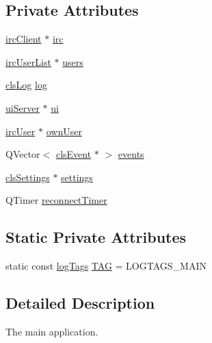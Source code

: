 \subsection*{Private Attributes}
\begin{DoxyCompactItemize}
\item 
\hyperlink{classserver_1_1irc_client}{irc\-Client} $\ast$ \hyperlink{classserver_1_1main_app_aba3a1f9b10639ec4ffc21dfbe70e0d35}{irc}
\item 
\hyperlink{classserver_1_1irc_user_list}{irc\-User\-List} $\ast$ \hyperlink{classserver_1_1main_app_a0ddcb17051b89af83cd188bf86f6de6e}{users}
\item 
\hyperlink{class_k4_u_1_1cls_log}{cls\-Log} \hyperlink{classserver_1_1main_app_a909a71dae4778f8fcd7f998eba857ff4}{log}
\item 
\hyperlink{classserver_1_1ui_server}{ui\-Server} $\ast$ \hyperlink{classserver_1_1main_app_a79270f76b62ff1a9d89c61a85978df94}{ui}
\item 
\hyperlink{classserver_1_1irc_user}{irc\-User} $\ast$ \hyperlink{classserver_1_1main_app_a01ad62ed879b9964ae2398be7d537c1c}{own\-User}
\item 
Q\-Vector$<$ \hyperlink{classshared_1_1events_1_1cls_event}{cls\-Event} $\ast$ $>$ \hyperlink{classserver_1_1main_app_acafd4b774e4e3ee6333fb7477d114330}{events}
\item 
\hyperlink{classserver_1_1cls_settings}{cls\-Settings} $\ast$ \hyperlink{classserver_1_1main_app_a5664d0e28cd8826e504098e13e3c644a}{settings}
\item 
Q\-Timer \hyperlink{classserver_1_1main_app_a1152ce37df612511638cfc6192e5fe9e}{reconnect\-Timer}
\end{DoxyCompactItemize}
\subsection*{Static Private Attributes}
\begin{DoxyCompactItemize}
\item 
static const \hyperlink{namespace_k4_u_afd00b8cce0ab5037b155e37caed9a3a5}{log\-Tags} \hyperlink{classserver_1_1main_app_aed05f9dc959d800c4d641c31185e3693}{T\-A\-G} = L\-O\-G\-T\-A\-G\-S\-\_\-\-M\-A\-I\-N
\end{DoxyCompactItemize}


\subsection{Detailed Description}
The main application. 

